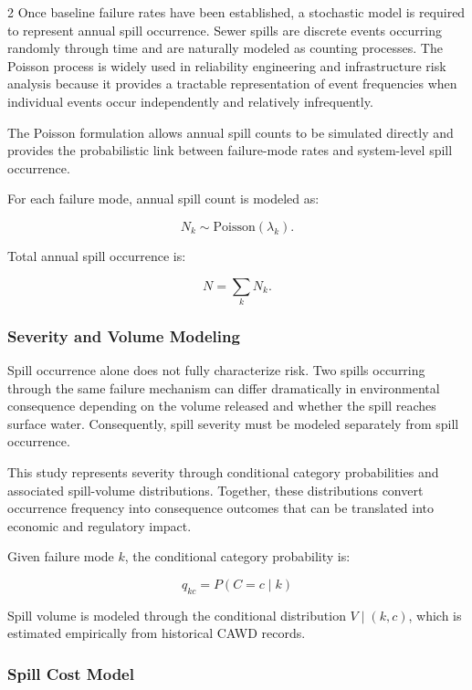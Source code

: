 \documentclass[10pt]{article}
\begin{document}
\begin{multicols}{2}
Once baseline failure rates have been established, a stochastic model is required to represent annual spill occurrence. Sewer spills are discrete events occurring randomly through time and are naturally modeled as counting processes. The Poisson process is widely used in reliability engineering and infrastructure risk analysis because it provides a tractable representation of event frequencies when individual events occur independently and relatively infrequently.

The Poisson formulation allows annual spill counts to be simulated directly and provides the probabilistic link between failure-mode rates and system-level spill occurrence.

For each failure mode, annual spill count is modeled as:

\[
N_k \sim \text{Poisson}(\lambda_k).
\]

Total annual spill occurrence is:

\[
N=\sum_k N_k.
\]

\subsubsection{Severity and Volume Modeling}

Spill occurrence alone does not fully characterize risk. Two spills occurring through the same failure mechanism can differ dramatically in environmental consequence depending on the volume released and whether the spill reaches surface water. Consequently, spill severity must be modeled separately from spill occurrence.

This study represents severity through conditional category probabilities and associated spill-volume distributions. Together, these distributions convert occurrence frequency into consequence outcomes that can be translated into economic and regulatory impact.

Given failure mode $k$, the conditional category probability is:

\[
q_{kc}=P(C=c\mid k)
\]

Spill volume is modeled through the conditional distribution $V\mid(k,c)$,
which is estimated empirically from historical CAWD records.


\subsubsection{Spill Cost Model}


\end{multicols}
\end{document}
